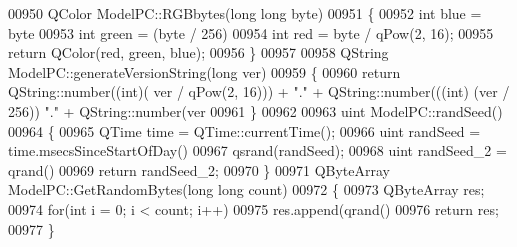 \begin{DoxyCode}
{00950 QColor ModelPC::RGBbytes(\textcolor{keywordtype}{long} \textcolor{keywordtype}{long} byte)
00951 \{
00952     \textcolor{keywordtype}{int} blue = byte %
00953     \textcolor{keywordtype}{int} green = (byte / 256) %
00954     \textcolor{keywordtype}{int} red = byte / qPow(2, 16);
00955     \textcolor{keywordflow}{return} QColor(red, green, blue);
00956 \}
00957 
00958 QString ModelPC::generateVersionString(\textcolor{keywordtype}{long} ver)
00959 \{
00960     \textcolor{keywordflow}{return} QString::number((\textcolor{keywordtype}{int})( ver / qPow(2, 16))) + \textcolor{stringliteral}{"."} + QString::number(((\textcolor{keywordtype}{int}) (ver / 256)) %
      "."} + QString::number(ver %
00961 \}
00962 
00963 uint ModelPC::randSeed()
00964 \{
00965     QTime time = QTime::currentTime();
00966     uint randSeed = time.msecsSinceStartOfDay() %
00967     qsrand(randSeed);
00968     uint randSeed\_2 = qrand() %
00969     \textcolor{keywordflow}{return} randSeed\_2;
00970 \}
00971 QByteArray ModelPC::GetRandomBytes(\textcolor{keywordtype}{long} \textcolor{keywordtype}{long} count)
00972 \{
00973     QByteArray res;
00974     \textcolor{keywordflow}{for}(\textcolor{keywordtype}{int} i = 0; i < count; i++)
00975        res.append(qrand() %
00976     \textcolor{keywordflow}{return} res;
00977 \}
\end{DoxyCode}
